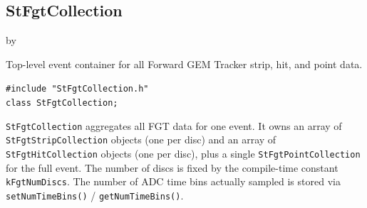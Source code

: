\documentclass[twoside]{article}
\newcommand{\entrylabel}[1]{\mbox{\textbf{{#1}}}\hfil}%
\newenvironment{entry}
{\begin{list}{}%
    {\renewcommand{\makelabel}{\entrylabel}%
     \setlength{\labelwidth}{90pt}%
     \setlength{\leftmargin}{\labelwidth}
     \advance\leftmargin by \labelsep%
      }%
    }%
  {\end{list}}
\newcommand{\Entrylabel}[1]%
{\raisebox{0pt}[1ex][0pt]{\makebox[\labelwidth][l]%
    {\parbox[t]{\labelwidth}{\hspace{0pt}\textbf{{#1}}}}}}
\newenvironment{Entry}%
{\renewcommand{\entrylabel}{\Entrylabel}\begin{entry}}%
  {\end{entry}}
\begin{document}
\subsection{StFgtCollection}
\label{sec:StFgtCollection}
\begin{Entry}
\item[Summary] Top-level event container for all Forward GEM Tracker strip, hit, and
  point data.
\item[Synopsis]
    \verb+#include "StFgtCollection.h"+\\
    \verb+class StFgtCollection;+\\
\item[Description]
  \texttt{StFgtCollection} aggregates all FGT data for one event.  It owns an array of
  \texttt{StFgtStripCollection} objects (one per disc) and an array of
  \texttt{StFgtHitCollection} objects (one per disc), plus a single
  \texttt{StFgtPointCollection} for the full event.  The number of discs is fixed by the
  compile-time constant \texttt{kFgtNumDiscs}.  The number of ADC time bins actually
  sampled is stored via \texttt{setNumTimeBins()} / \texttt{getNumTimeBins()}.


\end{Entry}
\end{document}
